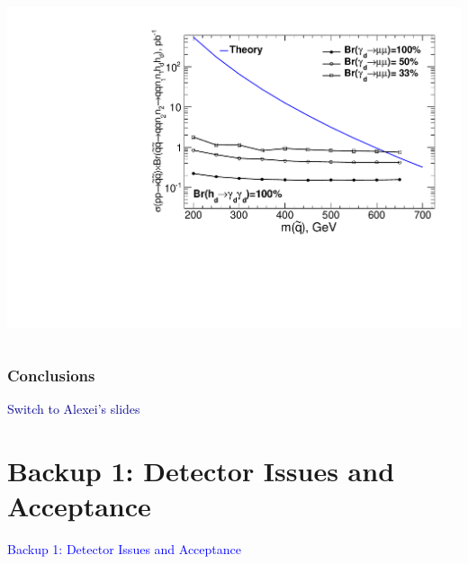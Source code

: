 \documentclass[compress]{beamer}
\begin{document}
\begin{frame}
\begin{columns}
\includegraphics[width=\linewidth]{ulimit_model1.pdf}
\end{columns}
\end{frame}

\begin{frame}
\frametitle{Conclusions}

\Large \textcolor{darkblue}{Switch to Alexei's slides}

\label{numpages}
\end{frame}

\section*{Backup 1: Detector Issues and Acceptance}
\begin{frame}

\vfill
\begin{center}
\Huge \textcolor{blue}{Backup 1: Detector Issues and Acceptance}
\end{center}

\vfill
\end{frame}
\end{document}
